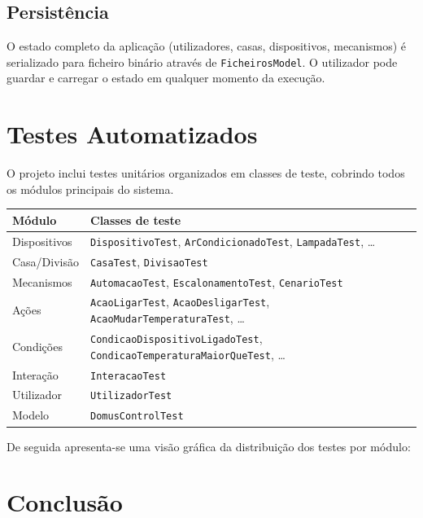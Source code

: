 \documentclass[a4paper]{article}
\begin{document}
\subsection{Persistência}

O estado completo da aplicação (utilizadores, casas, dispositivos, mecanismos) é serializado para ficheiro binário através de \texttt{FicheirosModel}. O utilizador pode guardar e carregar o estado em qualquer momento da execução.

\section{Testes Automatizados}

O projeto inclui testes unitários organizados em classes de teste, cobrindo todos os módulos principais do sistema.

\begin{center}
\begin{tabular}{ll}
    \toprule
    \textbf{Módulo} & \textbf{Classes de teste} \\
    \midrule
    Dispositivos & \texttt{DispositivoTest}, \texttt{ArCondicionadoTest}, \texttt{LampadaTest}, \ldots \\
    Casa/Divisão & \texttt{CasaTest}, \texttt{DivisaoTest} \\
    Mecanismos & \texttt{AutomacaoTest}, \texttt{EscalonamentoTest}, \texttt{CenarioTest} \\
    Ações & \texttt{AcaoLigarTest}, \texttt{AcaoDesligarTest}, \texttt{AcaoMudarTemperaturaTest}, \ldots \\
    Condições & \texttt{CondicaoDispositivoLigadoTest}, \texttt{CondicaoTemperaturaMaiorQueTest}, \ldots \\
    Interação & \texttt{InteracaoTest} \\
    Utilizador & \texttt{UtilizadorTest} \\
    Modelo & \texttt{DomusControlTest} \\
    \bottomrule
\end{tabular}
\end{center}

De seguida apresenta-se uma visão gráfica da distribuição dos testes por módulo:

\section{Conclusão}
 
\end{document}
